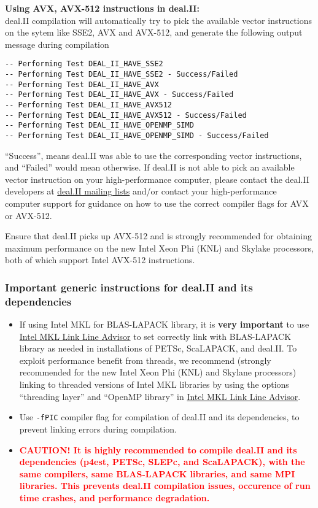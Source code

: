 {\bf Using AVX, AVX-512 instructions in deal.II:}\\
deal.II compilation will automatically try to pick the available vector instructions on the sytem like SSE2, AVX and AVX-512, and generate the following output message during compilation   
\begin{verbatim}
-- Performing Test DEAL_II_HAVE_SSE2
-- Performing Test DEAL_II_HAVE_SSE2 - Success/Failed
-- Performing Test DEAL_II_HAVE_AVX
-- Performing Test DEAL_II_HAVE_AVX - Success/Failed
-- Performing Test DEAL_II_HAVE_AVX512
-- Performing Test DEAL_II_HAVE_AVX512 - Success/Failed
-- Performing Test DEAL_II_HAVE_OPENMP_SIMD
-- Performing Test DEAL_II_HAVE_OPENMP_SIMD - Success/Failed
\end{verbatim}
``Success'', means deal.II was able to use the corresponding vector instructions, and ``Failed'' would mean otherwise. If deal.II is not able to pick an available vector instruction on your high-performance computer, please contact the deal.II developers at \href{https://groups.google.com/d/forum/dealii}{deal.II mailing lists} and/or contact your high-performance computer support for guidance on how to use the correct compiler flags for AVX or AVX-512. 

Ensure that deal.II picks up AVX-512 and is strongly recommended for obtaining maximum performance on the new Intel Xeon Phi (KNL) and Skylake processors, both of which support Intel AVX-512 instructions.

\subsubsection{Important generic instructions for deal.II and its dependencies}
\begin{itemize}
\item If using Intel MKL for BLAS-LAPACK library, it is {\bf very important} to use \href{https://software.intel.com/en-us/articles/intel-mkl-link-line-advisor}{Intel MKL Link Line Advisor} to set correctly link with BLAS-LAPACK library as needed in installations of PETSc, ScaLAPACK, and deal.II. To exploit performance benefit from threads, we recommend (strongly recommended for the new Intel Xeon Phi (KNL) and Skylane processors) linking to threaded versions of Intel MKL libraries by using the options ``threading layer'' and  ``OpenMP library'' in \href{https://software.intel.com/en-us/articles/intel-mkl-link-line-advisor}{Intel MKL Link Line Advisor}.

\item Use \verb|-fPIC| compiler flag for compilation of deal.II and its dependencies, to prevent linking errors during \dftfe{} compilation.	

\item \textcolor{red}{\bf CAUTION! It is  highly recommended to compile deal.II and its dependencies (p4est, PETSc, SLEPc, and ScaLAPACK),  with the same compilers, same BLAS-LAPACK libraries, and same MPI libraries. This prevents deal.II compilation issues, occurence of run time crashes, and \dftfe{} performance degradation.}  
\end{itemize}

